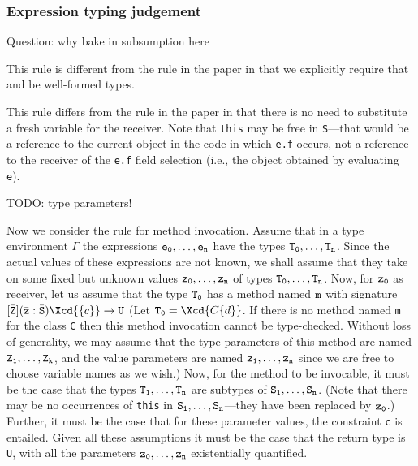 \subsubsection{
        Expression typing judgement
}

Question: why bake in subsumption here



This rule is different from the rule in the paper in that we explicitly
require that  and  be well-formed types.





This rule differs from the rule in the paper in that there is no need to
substitute a fresh variable for the receiver. Note that {\tt this} may be free
in {\tt S}---that would be a reference to the current object in the code in
which {\tt e.f} occurs, not a reference to the receiver of the {\tt e.f} field
selection (i.e., the object obtained by evaluating {\tt e}).



TODO: type parameters!

Now we consider the rule for method invocation. Assume that in a type
environment $\Gamma$ the expressions ${\tt e_0}, \dots, {\tt e_n}$
have the types ${\tt T_0}, \dots, {\tt T_n}$.
Since the
actual values of these expressions are not known, we shall assume that
they take on some fixed but unknown values
                                     ${\tt z_0}, \dots, {\tt z_n}$
of types ${\tt T_0}, \dots, {\tt T_n}$.
Now, for ${\tt z_0}$ as receiver, let us assume that the type
${\tt T_0}$ has a method named ${\tt m}$
with signature
$[\bar{\tt Z}](\bar{\tt z}: \bar{\tt S})\Xcd{\{c\}} \to {\tt U}$
(Let ${\tt T_0} = \Xcd{C\{d\}}$.
 If there is no
method named {\tt m} for the class {\tt C} then this method invocation cannot be
type-checked. Without loss of generality, we may assume that the
type parameters of this method are named
                                     ${\tt Z_1}, \dots, {\tt Z_k}$, and
the value parameters are named
                                     ${\tt z_1}, \dots, {\tt z_n}$
since we are free to choose
variable names as we wish.)
Now, for the method to be invocable,
it must be the case that the types
    ${\tt T_1}, \dots, {\tt T_n}$
are subtypes of
    ${\tt S_1}, \dots, {\tt S_n}$.
(Note
that there may be no occurrences of {\tt this} in
    ${\tt S_1}, \dots, {\tt S_n}$---they have been
replaced by ${\tt z_0}$.)
Further, it must be the case that for these parameter
values, the constraint {\tt c} is entailed. Given all these assumptions it
must be the case that the return type is {\tt U}, with all the parameters
    ${\tt z_0}, \dots, {\tt z_n}$
existentially quantified.

